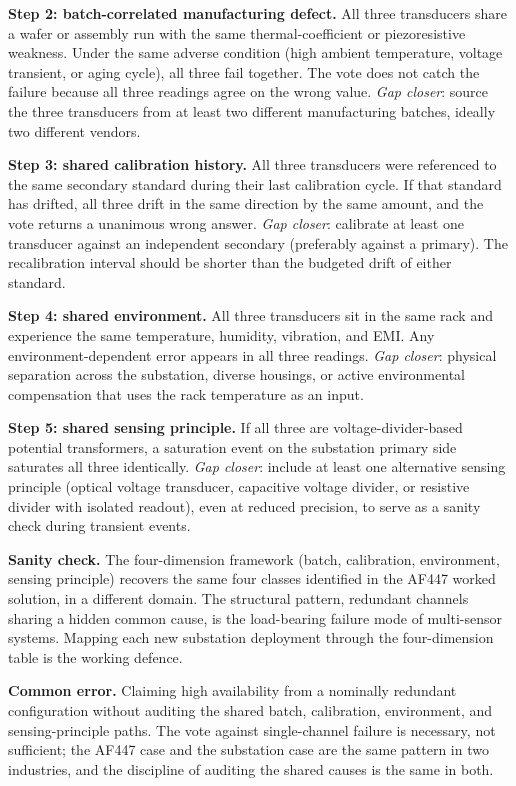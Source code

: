 \textbf{Step 2: batch-correlated manufacturing defect.} All three
transducers share a wafer or assembly run with the same
thermal-coefficient or piezoresistive weakness. Under the same
adverse condition (high ambient temperature, voltage transient,
or aging cycle), all three fail together. The vote does not catch
the failure because all three readings agree on the wrong value.
\emph{Gap closer}: source the three transducers from at least two
different manufacturing batches, ideally two different vendors.

\textbf{Step 3: shared calibration history.} All three transducers
were referenced to the same secondary standard during their last
calibration cycle. If that standard has drifted, all three drift
in the same direction by the same amount, and the vote returns a
unanimous wrong answer.
\emph{Gap closer}: calibrate at least one transducer against an
independent secondary (preferably against a primary). The
recalibration interval should be shorter than the budgeted drift
of either standard.

\textbf{Step 4: shared environment.} All three transducers sit in
the same rack and experience the same temperature, humidity,
vibration, and EMI. Any environment-dependent error appears in
all three readings.
\emph{Gap closer}: physical separation across the substation,
diverse housings, or active environmental compensation that uses
the rack temperature as an input.

\textbf{Step 5: shared sensing principle.} If all three are
voltage-divider-based potential transformers, a saturation event
on the substation primary side saturates all three identically.
\emph{Gap closer}: include at least one alternative sensing
principle (optical voltage transducer, capacitive voltage
divider, or resistive divider with isolated readout), even at
reduced precision, to serve as a sanity check during transient
events.

\textbf{Sanity check.} The four-dimension framework
(batch, calibration, environment, sensing principle) recovers the
same four classes identified in the AF447 worked solution, in a
different domain. The structural pattern, redundant channels
sharing a hidden common cause, is the load-bearing failure mode
of multi-sensor systems. Mapping each new substation deployment
through the four-dimension table is the working defence.

\textbf{Common error.} Claiming high availability from a
nominally redundant configuration without auditing the shared
batch, calibration, environment, and sensing-principle paths.
The vote against single-channel failure is necessary, not
sufficient; the AF447 case and the substation case are the same
pattern in two industries, and the discipline of auditing the
shared causes is the same in both.

